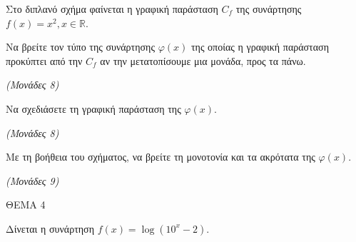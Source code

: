 \documentclass[11pt,a4paper,twoside]{book}
\newcommand{\monades}[1]{\hfill \textit{(Μονάδες #1)}}
\begin{document}
\begin{center}


\end{center}
Στο διπλανό σχήμα φαίνεται η γραφική παράσταση $C_f$ της συνάρτησης $f(x) = x^2, x \in \mathbb{R}$.

\begin{alist}
\item Να βρείτε τον τύπο της συνάρτησης $\varphi(x)$ της οποίας η γραφική παράσταση προκύπτει από την $C_f$ αν την μετατοπίσουμε μια μονάδα, προς τα πάνω.

\monades{8}

\item Να σχεδιάσετε τη γραφική παράσταση της $\varphi(x)$.

\monades{8}

\item Με τη βοήθεια του σχήματος, να βρείτε τη μονοτονία και τα ακρότατα της $\varphi(x)$.

\monades{9}
\end{alist}

\vspace{4mm}

ΘΕΜΑ 4

Δίνεται η συνάρτηση $f(x) = \log(10^x - 2)$.
\end{document}
